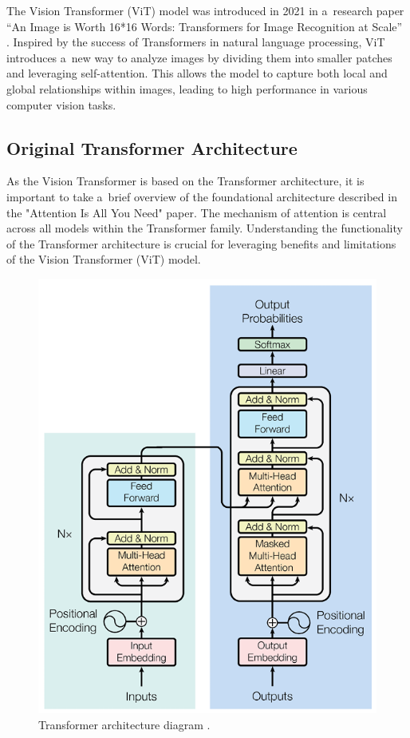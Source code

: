 The Vision Transformer (ViT) model was introduced in 2021 in a~research paper “An Image is Worth 16*16 Words: Transformers for Image Recognition at Scale” \cite{dosovitskiy2021imageworth16x16words}. Inspired by the success of Transformers in natural language processing, ViT introduces a~new way to analyze images by dividing them into smaller patches and leveraging self-attention. This allows the model to capture both local and global relationships within images, leading to high performance in various computer vision tasks.

\subsection*{Original Transformer Architecture}

As the Vision Transformer is based on the Transformer architecture, it is important to take a~brief overview of the foundational architecture described in the "Attention Is All You Need" \cite{vaswani2023attentionneed} paper. The mechanism of attention is central across all models within the Transformer family. Understanding the functionality of the Transformer architecture is crucial for leveraging benefits and limitations of the Vision Transformer (ViT) model.

\begin{figure}[htbp]
    \centering
    \includegraphics[width=0.55\linewidth]{obrazky-figures/02-theoretical-basis/transformer-architecture.png}
    \caption{Transformer architecture diagram \cite{vaswani2023attentionneed}.}
    \label{fig:transformer_architecture}
\end{figure}


